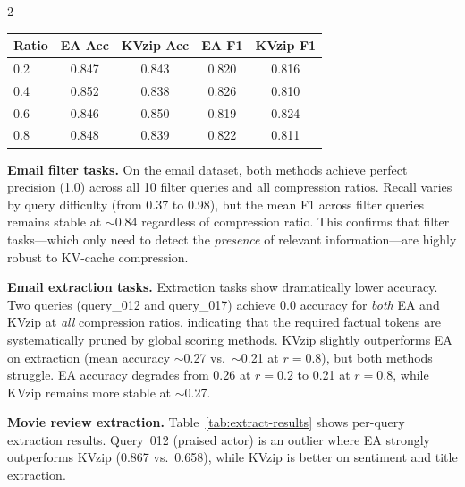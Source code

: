 \documentclass[10pt,a4paper]{article}
\begin{document}
\begin{multicols}{2}
\begin{center}
  \centering
  \label{tab:reviews-results}
  \begin{tabular}{lcccc}
    \toprule
    Ratio & EA Acc & KVzip Acc & EA F1 & KVzip F1 \\
    \midrule
    0.2 & 0.847 & 0.843 & 0.820 & 0.816 \\
    0.4 & 0.852 & 0.838 & 0.826 & 0.810 \\
    0.6 & 0.846 & 0.850 & 0.819 & 0.824 \\
    0.8 & 0.848 & 0.839 & 0.822 & 0.811 \\
    \bottomrule
  \end{tabular}
\end{center}

\begin{center}
  \centering
  \fbox{\rule{0pt}{3.2cm}\rule{0.9\columnwidth}{0pt}}
  \label{fig:reviews-metrics}
\end{center}

\textbf{Email filter tasks.}
On the email dataset, both methods achieve perfect precision (1.0) across
all 10 filter queries and all compression ratios. Recall varies by query
difficulty (from 0.37 to 0.98), but the mean F1 across filter queries
remains stable at $\sim$0.84 regardless of compression ratio. This
confirms that filter tasks---which only need to detect the
\emph{presence} of relevant information---are highly robust to KV-cache
compression.

\textbf{Email extraction tasks.}
Extraction tasks show dramatically lower accuracy. Two queries
(query\_012 and query\_017) achieve 0.0 accuracy for \emph{both} EA and
KVzip at \emph{all} compression ratios, indicating that the required
factual tokens are systematically pruned by global scoring methods.
KVzip slightly outperforms EA on extraction (mean accuracy $\sim$0.27
vs.\ $\sim$0.21 at $r=0.8$), but both methods struggle. EA accuracy
degrades from 0.26 at $r=0.2$ to 0.21 at $r=0.8$, while KVzip remains
more stable at $\sim$0.27.

\textbf{Movie review extraction.}
Table~\ref{tab:extract-results} shows per-query extraction results.
Query~012 (praised actor) is an outlier where EA strongly outperforms
KVzip (0.867 vs.\ 0.658), while KVzip is better on sentiment and title
extraction.


\end{multicols}
\end{document}
